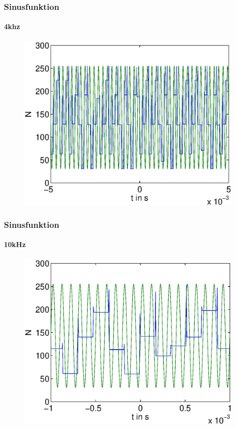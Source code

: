 \begin{frame}
    \frametitle{Sinusfunktion}
    \framesubtitle{4khz}
     \begin{figure}[H]
     \begin{center}
             \includegraphics[scale=0.5]{./img/graph/Aufgabe3_4khz_N.eps}
     \end{center}
     \end{figure}
\end{frame}
\begin{frame}
    \frametitle{Sinusfunktion}
    \framesubtitle{10kHz}
     \begin{figure}[H]
     \begin{center}
             \includegraphics[scale=0.5]{./img/graph/Aufgabe3_10khz_N.eps}
     \end{center}
     \end{figure}
\end{frame}
